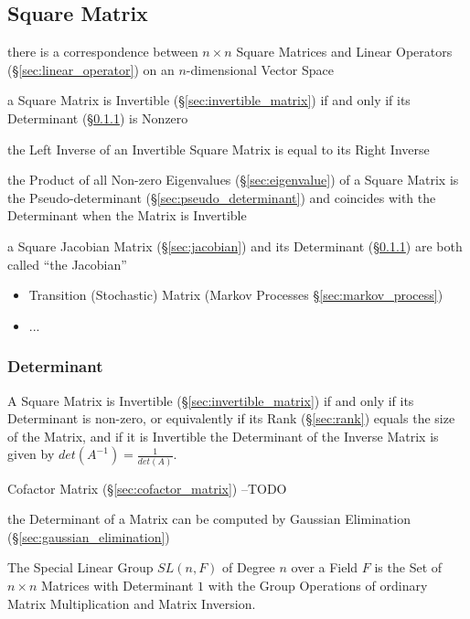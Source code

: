 \subsection{Square Matrix}\label{sec:square_matrix}

there is a correspondence between $n\times{n}$ Square Matrices and Linear
Operators (\S\ref{sec:linear_operator}) on an $n$-dimensional Vector Space

a Square Matrix is Invertible (\S\ref{sec:invertible_matrix}) if and only if
its Determinant (\S\ref{sec:determinant}) is Nonzero

the Left Inverse of an Invertible Square Matrix is equal to its Right Inverse

the Product of all Non-zero Eigenvalues (\S\ref{sec:eigenvalue}) of a Square
Matrix is the Pseudo-determinant (\S\ref{sec:pseudo_determinant}) and coincides
with the Determinant when the Matrix is Invertible

a Square Jacobian Matrix (\S\ref{sec:jacobian}) and its Determinant
(\S\ref{sec:determinant}) are both called ``the Jacobian''

\begin{itemize}
  \item Transition (Stochastic) Matrix (Markov Processes
    \S\ref{sec:markov_process})
  \item ...
\end{itemize}



\subsubsection{Determinant}\label{sec:determinant}

A Square Matrix is Invertible (\S\ref{sec:invertible_matrix}) if and only if
its Determinant is non-zero, or equivalently if its Rank (\S\ref{sec:rank})
equals the size of the Matrix, and if it is Invertible the Determinant of the
Inverse Matrix is given by $det(A^{-1}) = \frac{1}{det(A)}$.

Cofactor Matrix (\S\ref{sec:cofactor_matrix}) --TODO

\fist the Determinant of a Matrix can be computed by Gaussian Elimination
(\S\ref{sec:gaussian_elimination})

The Special Linear Group $SL(n,F)$ of Degree $n$ over a Field $F$ is the Set of
$n \times n$ Matrices with Determinant $1$ with the Group Operations of
ordinary Matrix Multiplication and Matrix Inversion.

